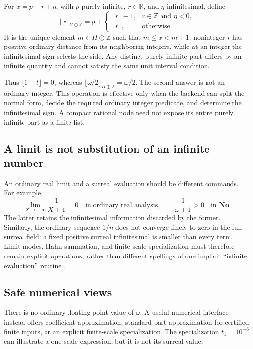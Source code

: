 \documentclass[11pt,letterpaper]{article}
\theoremstyle{definition}
\newcommand{\No}{\mathbf{No}}
\newcommand{\R}{\mathbb R}
\newcommand{\Z}{\mathbb Z}
\numberwithin{equation}{section}
\begin{document}
For $x=p+r+\eta$, with $p$ purely infinite, $r\in\R$, and $\eta$ infinitesimal, define
\[
 \lfloor x\rfloor_{\Pi\oplus\Z}
 =p+\begin{cases}
 \lfloor r\rfloor-1,&r\in\Z\text{ and }\eta<0,\\
 \lfloor r\rfloor,&\text{otherwise}.
 \end{cases}
\]
It is the unique element $m\in\Pi\oplus\Z$ such that $m\le x<m+1$: noninteger $r$ has positive ordinary distance from its neighboring integers, while at an integer the infinitesimal sign selects the side. Any distinct purely infinite part differs by an infinite quantity and cannot satisfy the same unit interval condition.

Thus $\lfloor1-t\rfloor=0$, whereas $\lfloor\omega/2\rfloor_{\Pi\oplus\Z}=\omega/2$. The second answer is not an ordinary integer. This operation is effective only when the backend can split the normal form, decide the required ordinary integer predicate, and determine the infinitesimal sign. A compact rational node need not expose its entire purely infinite part as a finite list.

\subsection{A limit is not substitution of an infinite number}
An ordinary real limit and a surreal evaluation should be different commands. For example,
\[
 \lim_{X\to+\infty}\frac1{X+1}=0\quad\text{in ordinary real analysis},
 \qquad \frac1{\omega+1}>0\quad\text{in }\No.
\]
The latter retains the infinitesimal information discarded by the former. Similarly, the ordinary sequence $1/n$ does not converge finely to zero in the full surreal field: a fixed positive surreal infinitesimal is smaller than every term. Limit modes, Hahn summation, and finite-scale specialization must therefore remain explicit operations, rather than different spellings of one implicit ``infinite evaluation'' routine \cite{SourceAnalysis}.

\subsection{Safe numerical views}
There is no ordinary floating-point value of $\omega$. A useful numerical interface instead offers coefficient approximation, standard-part approximation for certified finite inputs, or an explicit finite-scale specialization. The specialization $t_1=10^{-6}$ can illustrate a one-scale expression, but it is not its surreal value.
\end{document}
